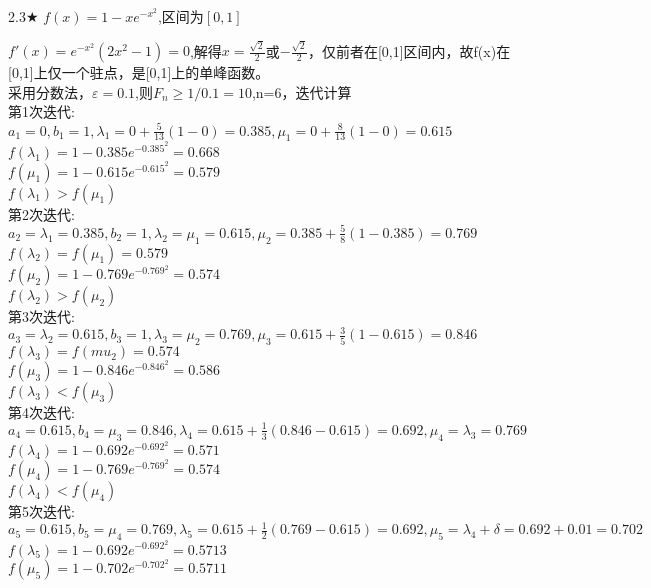 \begin{problem}{2.3$\bigstar$}
    $f(x)=1-xe^{-x^2}$,区间为$[0,1]$
\end{problem}
\begin{solution}
    $f'(x)=e^{-x^2}(2x^2-1)=0$,解得$x=\frac{\sqrt{2}}{2}$或$-\frac{\sqrt{2}}{2}$，仅前者在[0,1]区间内，故f(x)在[0,1]上仅一个驻点，是[0,1]上的单峰函数。\\
    采用分数法，$\varepsilon=0.1$,则$F_n\geq1/0.1=10$,n=6，迭代计算\\
    第1次迭代:\\
    $a_1=0,b_1=1,\lambda_1=0+\frac{5}{13}(1-0)=0.385,\mu_1=0+\frac{8}{13}(1-0)=0.615$\\
    $f(\lambda_1)=1-0.385e^{-0.385^2}=0.668$\\
    $f(\mu_1)=1-0.615e^{-0.615^2}=0.579$\\
    $f(\lambda_1)>f(\mu_1)$\\
    第2次迭代:\\
    $a_2=\lambda_1=0.385,b_2=1,\lambda_2=\mu_1=0.615,\mu_2=0.385+\frac{5}{8}(1-0.385)=0.769$\\
    $f(\lambda_2)=f(\mu_1)=0.579$\\
    $f(\mu_2)=1-0.769e^{-0.769^2}=0.574$\\
    $f(\lambda_2)>f(\mu_2)$\\
    第3次迭代:\\
    $a_3=\lambda_2=0.615,b_3=1,\lambda_3=\mu_2=0.769,\mu_3=0.615+\frac{3}{5}(1-0.615)=0.846$\\
    $f(\lambda_3)=f(mu_2)=0.574$\\
    $f(\mu_3)=1-0.846e^{-0.846^2}=0.586$\\
    $f(\lambda_3)<f(\mu_3)$\\
    第4次迭代:\\
    $a_4=0.615,b_4=\mu_3=0.846,\lambda_4=0.615+\frac{1}{3}(0.846-0.615)=0.692,\mu_4=\lambda_3=0.769$\\
    $f(\lambda_4)=1-0.692e^{-0.692^2}=0.571$\\
    $f(\mu_4)=1-0.769e^{-0.769^2}=0.574$\\
    $f(\lambda_4)<f(\mu_4)$\\
    第5次迭代:\\
    $a_5=0.615,b_5=\mu_4=0.769,\lambda_5=0.615+\frac{1}{2}(0.769-0.615)=0.692,\mu_5=\lambda_4+\delta=0.692+0.01=0.702$\\
    $f(\lambda_5)=1-0.692e^{-0.692^2}=0.5713$\\
    $f(\mu_5)=1-0.702e^{-0.702^2}=0.5711$\\

\end{solution}
